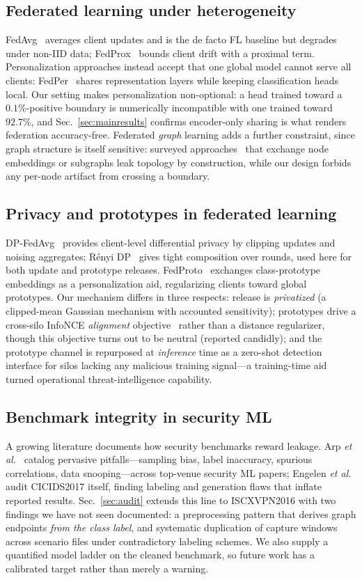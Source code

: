 \documentclass[journal]{IEEEtran}
\begin{document}
\subsection{Federated learning under heterogeneity}
FedAvg~\cite{fedavg} averages client updates and is the de facto FL
baseline but degrades under non-IID data; FedProx~\cite{fedprox}
bounds client drift with a proximal term. Personalization approaches
instead accept that one global model cannot serve all clients:
FedPer~\cite{fedper} shares representation layers while keeping
classification heads local. Our setting makes personalization
non-optional: a head trained toward a $0.1\%$-positive boundary is
numerically incompatible with one trained toward $92.7\%$, and
Sec.~\ref{sec:mainresults} confirms encoder-only sharing is what
renders federation accuracy-free. Federated \emph{graph} learning adds
a further constraint, since graph structure is itself sensitive:
surveyed approaches~\cite{fedgraphsurvey} that exchange node
embeddings or subgraphs leak topology by construction, while our
design forbids any per-node artifact from crossing a boundary.

\subsection{Privacy and prototypes in federated learning}
DP-FedAvg~\cite{dpfedavg} provides client-level differential privacy
by clipping updates and noising aggregates; R\'enyi DP~\cite{renyidp}
gives tight composition over rounds, used here for both update and
prototype releases. FedProto~\cite{fedproto} exchanges class-prototype
embeddings as a personalization aid, regularizing clients toward
global prototypes. Our mechanism differs in three respects: release is
\emph{privatized} (a clipped-mean Gaussian mechanism with accounted
sensitivity); prototypes drive a cross-silo InfoNCE
\emph{alignment} objective~\cite{infonce} rather than a distance
regularizer, though this objective turns out to be neutral (reported
candidly); and the prototype channel is repurposed at
\emph{inference} time as a zero-shot detection interface for silos
lacking any malicious training signal---a training-time aid turned
operational threat-intelligence capability.

\subsection{Benchmark integrity in security ML}
A growing literature documents how security benchmarks reward leakage.
Arp \emph{et al.}~\cite{arp} catalog pervasive pitfalls---sampling
bias, label inaccuracy, spurious correlations, data snooping---across
top-venue security ML papers; Engelen \emph{et al.}~\cite{engelen}
audit CICIDS2017 itself, finding labeling and generation flaws that
inflate reported results. Sec.~\ref{sec:audit} extends this line to
ISCXVPN2016 with two findings we have not seen documented: a
preprocessing pattern that derives graph endpoints \emph{from the
class label}, and systematic duplication of capture windows across
scenario files under contradictory labeling schemes. We also supply a
quantified model ladder on the cleaned benchmark, so future work has a
calibrated target rather than merely a warning.
\end{document}

